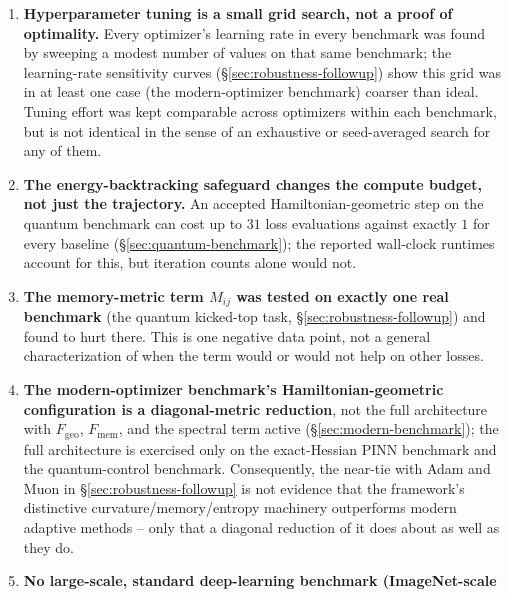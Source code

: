 \documentclass[10pt,twocolumn]{article}
\begin{document}
\begin{enumerate}
their paired parametric tests are not significant after Holm correction
($p=0.058$ and $0.143$), while the WikiText-2 LLM loss to AdaFactor is
consistent and significant across seeds (Holm $p=0.0107$), not a near-tie.
$n=10$ remains
underpowered to resolve the near-tie with Adam and Muon decisively
(\S\ref{sec:robustness-followup}), and several Holm-corrected comparisons in
\S\ref{sec:extended-ablation} sit in a borderline $0.05$--$0.15$ range
rather than being decisively resolved either way.
\item \textbf{Hyperparameter tuning is a small grid search, not a proof of
optimality.} Every optimizer's learning rate in every benchmark was found by
sweeping a modest number of values on that same benchmark; the
learning-rate sensitivity curves (\S\ref{sec:robustness-followup}) show this
grid was in at least one case (the modern-optimizer benchmark) coarser than
ideal. Tuning effort was kept comparable across optimizers within each
benchmark, but is not identical in the sense of an exhaustive or
seed-averaged search for any of them.
\item \textbf{The energy-backtracking safeguard changes the compute budget,
not just the trajectory.} An accepted Hamiltonian-geometric step on the
quantum benchmark can cost up to $31$ loss evaluations against exactly $1$
for every baseline (\S\ref{sec:quantum-benchmark}); the reported wall-clock
runtimes account for this, but iteration counts alone would not.
\item \textbf{The memory-metric term $M_{ij}$ was tested on exactly one real
benchmark} (the quantum kicked-top task, \S\ref{sec:robustness-followup})
and found to hurt there. This is one negative data point, not a general
characterization of when the term would or would not help on other losses.
\item \textbf{The modern-optimizer benchmark's Hamiltonian-geometric
configuration is a diagonal-metric reduction}, not the full architecture
with $F_{\mathrm{geo}}$, $F_{\mathrm{mem}}$, and the spectral term active
(\S\ref{sec:modern-benchmark}); the full architecture is exercised only on
the exact-Hessian PINN benchmark and the quantum-control benchmark.
Consequently, the near-tie with Adam and Muon in
\S\ref{sec:robustness-followup} is not evidence that the framework's
distinctive curvature/memory/entropy machinery outperforms modern adaptive
methods -- only that a diagonal reduction of it does about as well as they
do.
\item \textbf{No large-scale, standard deep-learning benchmark (ImageNet-scale
}
\end{enumerate}
\end{document}
